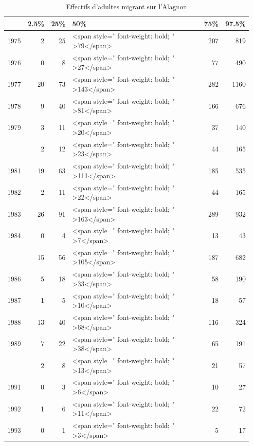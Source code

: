 \begin{table}[!h]

\caption{Effectifs d'adultes migrant sur l'Alagnon}
\centering
\begin{tabular}[t]{lrrlrr}
\toprule
  & 2.5\% & 25\% & 50\% & 75\% & 97.5\%\\
\midrule
1975 & 2 & 25 & <span style=" font-weight: bold;    " >79</span> & 207 & 819\\
1976 & 0 & 8 & <span style=" font-weight: bold;    " >27</span> & 77 & 490\\
1977 & 20 & 73 & <span style=" font-weight: bold;    " >143</span> & 282 & 1160\\
1978 & 9 & 40 & <span style=" font-weight: bold;    " >81</span> & 166 & 676\\
1979 & 3 & 11 & <span style=" font-weight: bold;    " >20</span> & 37 & 140\\
\addlinespace
1980 & 2 & 12 & <span style=" font-weight: bold;    " >23</span> & 44 & 165\\
1981 & 19 & 63 & <span style=" font-weight: bold;    " >111</span> & 185 & 535\\
1982 & 2 & 11 & <span style=" font-weight: bold;    " >22</span> & 44 & 165\\
1983 & 26 & 91 & <span style=" font-weight: bold;    " >163</span> & 289 & 932\\
1984 & 0 & 4 & <span style=" font-weight: bold;    " >7</span> & 13 & 43\\
\addlinespace
1985 & 15 & 56 & <span style=" font-weight: bold;    " >105</span> & 187 & 682\\
1986 & 5 & 18 & <span style=" font-weight: bold;    " >33</span> & 58 & 190\\
1987 & 1 & 5 & <span style=" font-weight: bold;    " >10</span> & 18 & 57\\
1988 & 13 & 40 & <span style=" font-weight: bold;    " >68</span> & 116 & 324\\
1989 & 7 & 22 & <span style=" font-weight: bold;    " >38</span> & 65 & 191\\
\addlinespace
1990 & 2 & 8 & <span style=" font-weight: bold;    " >13</span> & 21 & 57\\
1991 & 0 & 3 & <span style=" font-weight: bold;    " >6</span> & 10 & 27\\
1992 & 1 & 6 & <span style=" font-weight: bold;    " >11</span> & 22 & 72\\
1993 & 0 & 1 & <span style=" font-weight: bold;    " >3</span> & 5 & 17\\

\end{tabular}
\end{table}

